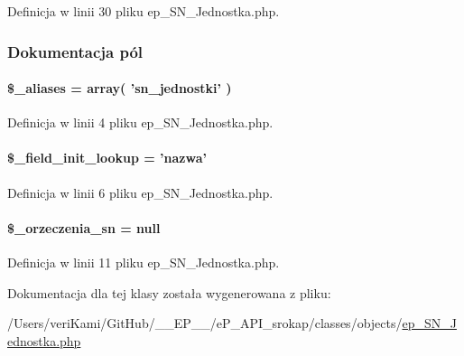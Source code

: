 Definicja w linii 30 pliku ep\-\_\-\-S\-N\-\_\-\-Jednostka.\-php.



\subsubsection{Dokumentacja pól}
\hypertarget{classep___s_n___jednostka_ab4e31d75f0bc5d512456911e5d01366b}{
\paragraph[{\$\-\_\-aliases}]{\setlength{\rightskip}{0pt plus 5cm}\$\-\_\-aliases = array( 'sn\-\_\-jednostki' )}}\label{classep___s_n___jednostka_ab4e31d75f0bc5d512456911e5d01366b}


Definicja w linii 4 pliku ep\-\_\-\-S\-N\-\_\-\-Jednostka.\-php.

\hypertarget{classep___s_n___jednostka_a4a4d54ae35428077a7c61ec8a5139af3}{
\paragraph[{\$\-\_\-field\-\_\-init\-\_\-lookup}]{\setlength{\rightskip}{0pt plus 5cm}\$\-\_\-field\-\_\-init\-\_\-lookup = 'nazwa'}}\label{classep___s_n___jednostka_a4a4d54ae35428077a7c61ec8a5139af3}


Definicja w linii 6 pliku ep\-\_\-\-S\-N\-\_\-\-Jednostka.\-php.

\hypertarget{classep___s_n___jednostka_a6f02468de85c0d4fa4f284d88f064662}{
\paragraph[{\$\-\_\-orzeczenia\-\_\-sn}]{\setlength{\rightskip}{0pt plus 5cm}\$\-\_\-orzeczenia\-\_\-sn = null\hspace{0.3cm}{\ttfamily [protected]}}}\label{classep___s_n___jednostka_a6f02468de85c0d4fa4f284d88f064662}


Definicja w linii 11 pliku ep\-\_\-\-S\-N\-\_\-\-Jednostka.\-php.



Dokumentacja dla tej klasy została wygenerowana z pliku\-:\begin{DoxyCompactItemize}
\item 
/\-Users/veri\-Kami/\-Git\-Hub/\-\_\-\-\_\-\-E\-P\-\_\-\-\_\-/e\-P\-\_\-\-A\-P\-I\-\_\-srokap/classes/objects/\hyperlink{ep___s_n___jednostka_8php}{ep\-\_\-\-S\-N\-\_\-\-Jednostka.\-php}\end{DoxyCompactItemize}
